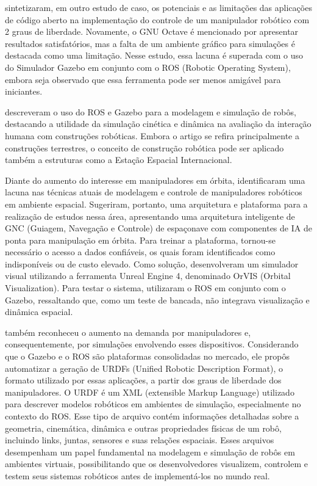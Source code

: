   sintetizaram, em outro estudo de caso, os potenciais e as limitações das aplicações de código aberto na implementação do controle de um manipulador robótico com 2 graus de liberdade. Novamente, o GNU Octave é mencionado por apresentar resultados satisfatórios, mas a falta de um ambiente gráfico para simulações é destacada como uma limitação. Nesse estudo, essa lacuna é superada com o uso do Simulador Gazebo em conjunto com o ROS (Robotic Operating System), embora seja observado que essa ferramenta pode ser menos amigável para iniciantes.

 descreveram o uso do ROS e Gazebo para a modelagem e simulação de robôs, destacando a utilidade da simulação cinética e dinâmica na avaliação da interação humana com construções robóticas. Embora o artigo se refira principalmente a construções terrestres, o conceito de construção robótica pode ser aplicado também a estruturas como a Estação Espacial Internacional.

Diante do aumento do interesse em manipuladores em órbita,  identificaram uma lacuna nas técnicas atuais de modelagem e controle de manipuladores robóticos em ambiente espacial. Sugeriram, portanto, uma arquitetura e plataforma para a realização de estudos nessa área, apresentando uma arquitetura inteligente de GNC (Guiagem, Navegação e Controle) de espaçonave com componentes de IA de ponta para manipulação em órbita. Para treinar a plataforma, tornou-se necessário o acesso a dados confiáveis, os quais foram identificados como indisponíveis ou de custo elevado. Como solução, desenvolveram um simulador visual utilizando a ferramenta Unreal Engine 4, denominado OrVIS (Orbital Visualization). Para testar o sistema, utilizaram o ROS em conjunto com o Gazebo, ressaltando que, como um teste de bancada, não integrava visualização e dinâmica espacial.

 também reconheceu o aumento na demanda por manipuladores e, consequentemente, por simulações envolvendo esses dispositivos. Considerando que o Gazebo e o ROS são plataformas consolidadas no mercado, ele propôs automatizar a geração de URDFs (Unified Robotic Description Format), o formato utilizado por essas aplicações, a partir dos graus de liberdade dos manipuladores. O URDF é um XML (extensible Markup Language) utilizado para descrever modelos robóticos em ambientes de simulação, especialmente no contexto do ROS. Esse tipo de arquivo contém informações detalhadas sobre a geometria, cinemática, dinâmica e outras propriedades físicas de um robô, incluindo links, juntas, sensores e suas relações espaciais. Esses arquivos desempenham um papel fundamental na modelagem e simulação de robôs em ambientes virtuais, possibilitando que os desenvolvedores visualizem, controlem e testem seus sistemas robóticos antes de implementá-los no mundo real.


